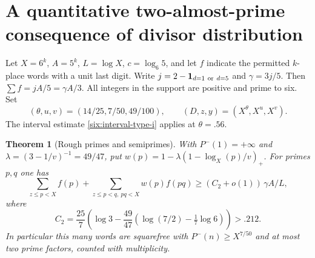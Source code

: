\documentclass[11pt,a4paper]{article}
\theoremstyle{paperplain}
\newtheorem{theorem}{Theorem}[section]
\numberwithin{equation}{section}
\begin{document}
\section{A quantitative two-almost-prime consequence of divisor distribution}
Let $X=6^k$, $A=5^k$, $L=\log X$, $c=\log_6 5$, and let
$f$ indicate the permitted $k$-place words with a unit last digit.
Write $j=2-\mathbf1_{d=1\ {\rm or}\ d=5}$ and $\gamma=3j/5$.
Then $\sum f=j A/5=\gamma A/3$. All integers in the support are
positive and prime to six. Set
\[
  (\theta,u,v)=(14/25,7/50,49/100),\qquad
  (D,z,y)=(X^\theta,X^u,X^v).
\]
The interval estimate \eqref{six:interval-type-i} applies at $\theta=.56$.
\begin{theorem}[Rough primes and semiprimes]\label{six:rough}
With $P^-(1)=+\infty$ and $\lambda=(3-1/v)^{-1}=49/47$,
put $w(p)=1-\lambda(1-\log_X(p)/v)_+$.
For primes $p,q$ one has
\[
 \sum_{z\le p<X} f(p)+\sum_{z\le p<q,\ pq<X}w(p) f(pq)
 \ge (C_2+o(1))\,\gamma A/L,
\]
where
\[
 C_2=\frac{25}7\left(\log3-\frac{49}{47}
        \left(\log(7/2)-\tfrac17\log6\right)\right)>.212 .
\]
In particular this many words are squarefree with $P^-(n)\ge X^{7/50}$
and at most two prime factors, counted with multiplicity.
\end{theorem}
\end{document}
